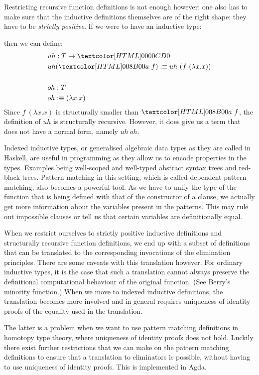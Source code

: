 Restricting recursive function definitions is not enough however: one
also has to make sure that the inductive definitions themselves are of
the right shape: they have to be \emph{strictly positive}. If we were
to have an inductive type:
\begin{datatype}{\Tty}{\Type}
  \constr{\Ta}{(\Tty \to \Tty) \to \Tty}
\end{datatype}
then we can define:
\begin{align*}
  &uh : T \to \emptyty \\
  &uh (\Ta\ f) \ddefeq uh\ (f\ (\lambda x . x)) \\
  \\
  &oh : T \\
  &oh \ddefeq (\lambda x . x)
\end{align*}
Since $f\ (\lambda x . x)$ is structurally smaller than $\Ta\ f$, the
definition of $uh$ is structurally recursive. However, it does give us
a term that does not have a normal form, namely $uh\ oh$.

Indexed inductive types, or generalised algebraic data types as they
are called in Haskell, are useful in programming as they allow us to
encode properties in the types. Examples being well-scoped and
well-typed abstract syntax trees and red-black trees. Pattern matching
in this setting, which is called dependent pattern matching, also
becomes a powerful tool. As we have to unify the type of the function
that is being defined with that of the constructor of a clause, we
actually get more information about the variables present in the
patterns. This may rule out impossible clauses or tell us that certain
variables are definitionally equal.

When we restrict ourselves to strictly positive inductive definitions
and structurally recursive function definitions, we end up with a
subset of definitions that can be translated to the corresponding
invocations of the elimination principles. There are some caveats with
this translation however. For ordinary inductive types, it is the case
that such a translation cannot always preserve the definitional
computational behaviour of the original function. (See Berry's
minority function.) When we move to indexed inductive definitions, the
translation becomes more involved and in general requires uniqueness
of identity proofs of the equality used in the translation.

The latter is a problem when we want to use pattern matching
definitions in homotopy type theory, where uniqueness of identity
proofs does not hold. Luckily there exist further restrictions that we
can make on the pattern matching definitions to ensure that a
translation to eliminators is possible, without having to use
uniqueness of identity proofs. This is implemented in Agda.


